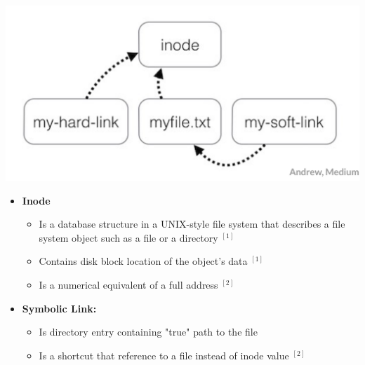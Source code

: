 \documentclass[12pt]{article}
\begin{document}
\begin{itemize}
    \begin{center}
    \includegraphics[width=0.8\linewidth]{images/week_8_notes_1_3.png}
    \end{center}

    \begin{itemize}
        \item \textbf{Inode}
        \begin{itemize}
            \item Is a database structure in a UNIX-style file system that describes
            a file system object such as a file or a directory $^{[1]}$
            \item Contains disk block location of the object's data $^{[1]}$
            \item Is a numerical equivalent of a full address $^{[2]}$
        \end{itemize}
        \item \textbf{Symbolic Link:}
        \begin{itemize}
            \item Is directory entry containing "true" path to the file
            \item Is a shortcut that reference to a file instead of inode value $^{[2]}$
        \end{itemize}


\end{itemize}
\end{itemize}
\end{document}
